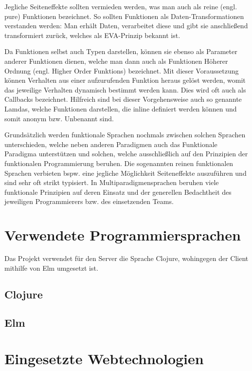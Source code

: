 Jegliche Seiteneffekte sollten vermieden werden, was man auch als reine (engl. pure) Funktionen bezeichnet.
So sollten Funktionen als Daten-Transformationen verstanden werden: Man erhält Daten, verarbeitet diese und gibt sie anschließend transformiert zurück, welches als \ac{EVA}-Prinzip bekannt ist.
\par
Da Funktionen selbst auch Typen darstellen, können sie ebenso als Parameter anderer Funktionen dienen, welche man dann auch als Funktionen Höherer Ordnung (engl. Higher Order Funktions) bezeichnet.
Mit dieser Voraussetzung können Verhalten aus einer aufzurufenden Funktion heraus gelöst werden, womit das jeweilige Verhalten dynamisch bestimmt werden kann.
Dies wird oft auch als Callbacks bezeichnet.
Hilfreich sind bei dieser Vorgehensweise auch so genannte Lamdas, welche Funktionen darstellen, die inline definiert werden können und somit anonym \ac{bzw.} Unbenannt sind.
\par
Grundsätzlich werden funktionale Sprachen nochmals zwischen solchen Sprachen unterschieden, welche neben anderen Paradigmen auch das Funktionale Paradigma unterstützen und solchen, welche ausschließlich auf den Prinzipien der funktionalen Programmierung beruhen.
Die sogenannten reinen funktionalen Sprachen verbieten \ac{bspw.} eine jegliche Möglichkeit Seiteneffekte auszuführen und sind sehr oft strikt typisiert.
In Multiparadigmensprachen beruhen viele funktionale Prinzipien auf deren Einsatz und der generellen Bedachtheit des jeweiligen Programmierers \ac{bzw.} des einsetzenden Teams.

\section{Verwendete Programmiersprachen}
Das Projekt verwendet für den Server die Sprache Clojure, wohingegen der Client mithilfe von Elm umgesetzt ist.
\subsection{Clojure}
\blindtext
\par
\blindtext
\subsection{Elm}
\blindtext
\par
\blindtext
\section{Eingesetzte Webtechnologien}
